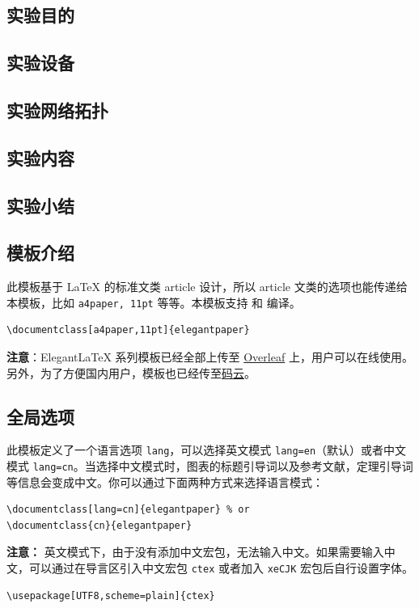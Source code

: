 \documentclass[lang=cn,11pt,a4paper,cite=authoryear]{elegantpaper}
\begin{document}
\subsection{实验目的}
\subsection{实验设备}
\subsection{实验网络拓扑}
\subsection{实验内容}
\subsection{实验小结}

\subsection{模板介绍}

此模板基于 \LaTeX{} 的标准文类 article 设计，所以 article 文类的选项也能传递给本模板，比如 \lstinline{a4paper, 11pt} 等等。本模板支持  和  编译。

\begin{lstlisting}
\documentclass[a4paper,11pt]{elegantpaper}
\end{lstlisting}

\textbf{注意}：Elegant\LaTeX{} 系列模板已经全部上传至 \href{https://www.overleaf.com/latex/templates/elegantpaper-template/yzghrqjhmmmr}{Overleaf} 上，用户可以在线使用。另外，为了方便国内用户，模板也已经传至\href{https://gitee.com/ElegantLaTeX/ElegantPaper}{码云}。


\subsection{全局选项}
此模板定义了一个语言选项 \lstinline{lang}，可以选择英文模式 \lstinline{lang=en}（默认）或者中文模式 \lstinline{lang=cn}。当选择中文模式时，图表的标题引导词以及参考文献，定理引导词等信息会变成中文。你可以通过下面两种方式来选择语言模式：
\begin{lstlisting}
\documentclass[lang=cn]{elegantpaper} % or
\documentclass{cn}{elegantpaper} 
\end{lstlisting}

\textbf{注意：} 英文模式下，由于没有添加中文宏包，无法输入中文。如果需要输入中文，可以通过在导言区引入中文宏包 \lstinline{ctex} 或者加入 \lstinline{xeCJK} 宏包后自行设置字体。 
\begin{lstlisting}
\usepackage[UTF8,scheme=plain]{ctex}
\end{lstlisting}
\end{document}
